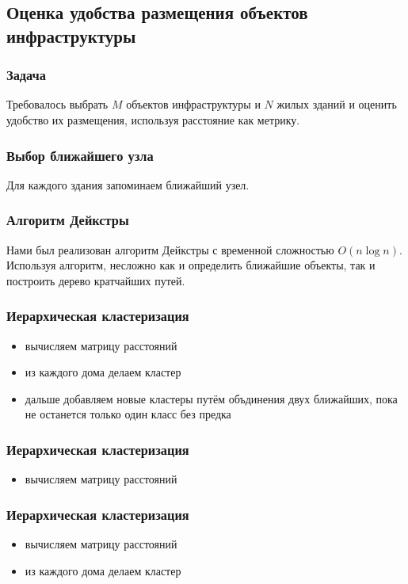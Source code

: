 \documentclass{beamer}
\begin{document}
\subsection{Оценка удобства размещения объектов инфраструктуры}
\begin{frame}
\frametitle{Задача}
Требовалось выбрать $ M $ объектов инфраструктуры и $ N $ жилых зданий и оценить удобство их размещения, используя расстояние как метрику.

\end{frame}
    
\begin{frame}
\frametitle{Выбор ближайшего узла}
Для каждого здания запоминаем ближайший узел.

\end{frame}

\begin{frame}
\frametitle{Алгоритм Дейкстры}
Нами был реализован алгоритм Дейкстры с временной сложностью $ O(n \log n) $.\\
Используя алгоритм, несложно как и определить ближайшие объекты, так и построить дерево кратчайших путей.
\end{frame}

\begin{frame}
	\frametitle{Иерархическая кластеризация}
	\begin{itemize}
		\item вычисляем матрицу расстояний
		\item из каждого дома делаем кластер
		\item дальше добавляем новые кластеры путём объдинения двух ближайших, пока не останется только один класс без предка
	\end{itemize}
\end{frame}

\begin{frame}
	\frametitle{Иерархическая кластеризация}
	\begin{itemize}
		\item вычисляем матрицу расстояний
	\end{itemize}
\end{frame}

\begin{frame}
	\frametitle{Иерархическая кластеризация}
	\begin{itemize}
		\item вычисляем матрицу расстояний
		\item из каждого дома делаем кластер
	\end{itemize}
\end{frame}
\end{document}
